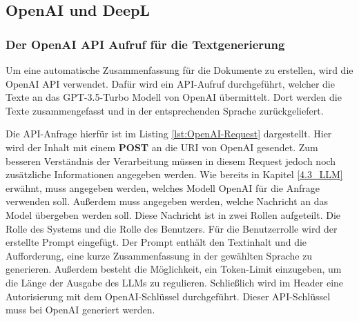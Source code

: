 
\subsection{OpenAI und DeepL}

\subsubsection{Der OpenAI \ac{API} Aufruf für die Textgenerierung}
Um eine automatische Zusammenfassung für die Dokumente zu erstellen, wird die OpenAI \ac{API} verwendet. Dafür wird ein \ac{API}-Aufruf durchgeführt, welcher die Texte an das \ac{GPT}-3.5-Turbo Modell von OpenAI übermittelt. Dort werden die Texte zusammengefasst und in der entsprechenden Sprache zurückgeliefert.

Die \ac{API}-Anfrage hierfür ist im Listing \ref{lst:OpenAI-Request} dargestellt. Hier wird der Inhalt mit einem \textbf{POST} an die \ac{URI} von OpenAI gesendet. Zum besseren Verständnis der Verarbeitung müssen in diesem Request jedoch noch zusätzliche Informationen angegeben werden. Wie bereits in Kapitel \ref{4.3_LLM} erwähnt, muss angegeben werden, welches Modell OpenAI für die Anfrage verwenden soll. Außerdem muss angegeben werden, welche Nachricht an das Model übergeben werden soll. Diese Nachricht ist in zwei Rollen aufgeteilt. Die Rolle des Systems und die Rolle des Benutzers. Für die Benutzerrolle wird der erstellte Prompt eingefügt. Der Prompt enthält den Textinhalt und die Aufforderung, eine kurze Zusammenfassung in der gewählten Sprache zu generieren. Außerdem besteht die Möglichkeit, ein Token-Limit einzugeben, um die Länge der Ausgabe des \ac{LLM}s zu regulieren. Schließlich wird im Header eine Autorisierung mit dem OpenAI-Schlüssel durchgeführt. Dieser \ac{API}-Schlüssel muss bei OpenAI generiert werden.

